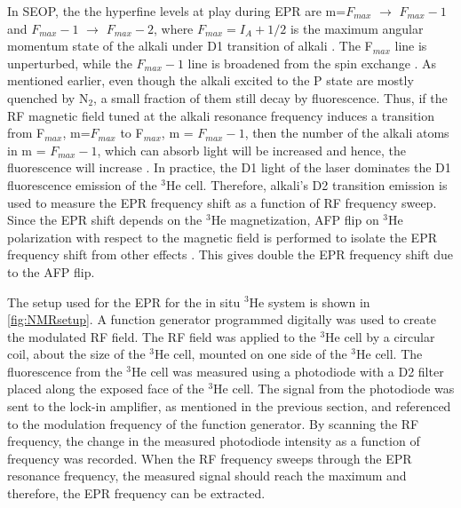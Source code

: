 In SEOP, the the hyperfine levels at play during EPR are m=$F_{max}$ $\rightarrow$ $F_{max}-1$ and $F_{max}-1$ $\rightarrow$ $F_{max}-2$, where $F_{max} = I_A+1/2$ is the maximum angular momentum state of the alkali under D1 transition of alkali \cite{Romalis1998, Gentile2017}. The F$_{max}$ line is unperturbed, while the $F_{max}-1$ line is broadened from the spin exchange \cite{Appelt1999}. As mentioned earlier, even though the alkali excited to the P state are mostly quenched by N$_2$, a small fraction of them still decay by fluorescence. Thus, if the RF magnetic field tuned at the alkali resonance frequency induces a transition from F$_{max}$, m=$F_{max}$ to F$_{max}$, m = $F_{max}-1$, then the number of the alkali atoms in m = $F_{max}-1$, which can absorb light will be increased and hence, the fluorescence will increase \cite{Romalis1998, Gentile2017}. In practice, the D1 light of the laser dominates the D1 fluorescence emission of the $^3$He cell. Therefore, alkali's D2 transition emission is used to measure the EPR frequency shift as a function of RF frequency sweep. Since the EPR shift depends on the $^3$He magnetization, AFP flip on $^3$He polarization with respect to the magnetic field is performed to isolate the EPR frequency shift from other effects \cite{Romalis1998}. This gives double the EPR frequency shift due to the AFP flip.


The setup used for the EPR for the in situ $^3$He system is shown in \cref{fig:NMRsetup}. A function generator programmed digitally was used to create the modulated RF field. The RF field was applied to the $^3$He cell by a circular coil, about the size of the $^3$He cell, mounted on one side of the $^3$He cell. The fluorescence from the $^3$He cell was measured using a photodiode with a D2 filter placed along the exposed face of the $^3$He cell. The signal from the photodiode was sent to the lock-in amplifier, as mentioned in the previous section, and referenced to the modulation frequency of the function generator. By scanning the RF frequency, the change in the measured photodiode intensity as a function of frequency was recorded. When the RF frequency sweeps through the EPR resonance frequency, the measured signal should reach the maximum and therefore, the EPR frequency can be extracted.

